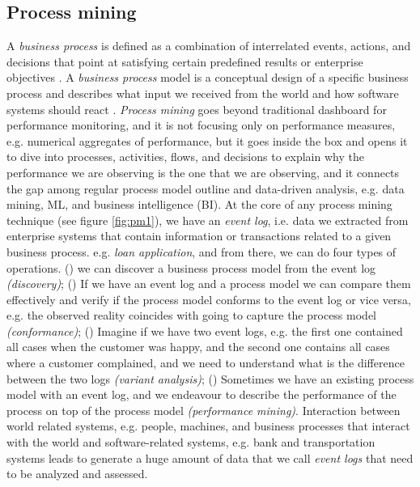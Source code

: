 \subsection{Process mining}
A \textit{business process} is defined as a combination of interrelated events, actions, and decisions that point at satisfying certain predefined results or enterprise objectives \cite{dumas2008business}. A \textit{business process} model is a conceptual design of a specific business process \cite{weske2007business} and describes what input we received from the world and how software systems should react  \cite{van2016data}. \textit{Process mining} goes beyond traditional dashboard for performance monitoring, and it is not focusing only on performance measures, e.g. numerical aggregates of performance, but it goes inside the box and opens it to dive into processes, activities, flows, and decisions to explain why the performance we are observing is the one that we are observing, and it connects the gap among regular process model outline and data-driven analysis, e.g. data mining, ML, and business intelligence (BI). At the core of any process mining technique (see figure \ref{fig:pm1}), we have an \textit{event log}, i.e. data we extracted from enterprise systems that contain information or transactions related to a given business process. e.g. \textit{loan application},  and from there, we can do four types of operations. () we can discover a business process model from the event log \textit{(discovery)}; () If we have an event log and a process model we can compare them effectively and verify if the process model conforms to the event log or vice versa, e.g. the observed reality coincides with going to capture the process model \textit{(conformance)}; () Imagine if we have two event logs, e.g. the first one contained all cases when the customer was happy, and the second one contains all cases where a customer complained, and we need to understand what is the difference between the two logs \textit{(variant analysis)}; () Sometimes we have an existing process model with an event log, and we endeavour to describe the performance of the process on top of the process model \textit{(performance mining)}. Interaction between world related systems, e.g. people, machines, and business processes that interact with the world and software-related systems, e.g. bank and transportation systems leads to generate a huge amount of data that we call \textit{event logs} that need to be analyzed and assessed.


